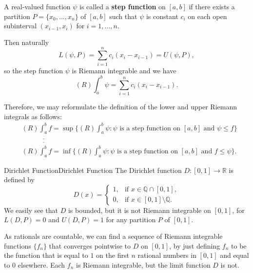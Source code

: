 \documentclass[../main.tex]{subfiles}
\begin{document}
A real-valued function $\psi$ is called a \textbf{step function} on $[a, b]$ if there exists a partition $P = \{ x_0, \ldots , x_n \}$ of $[a, b]$ such that $\psi$ is constant $c_i$ on each open subinterval $(x_{i-1}, x_i)$ for $i = 1, \ldots , n$.

Then naturally
\begin{equation*}
	L(\psi, P) = \sum_{i=1}^{n} c_i (x_i - x_{i-1}) = U(\psi, P),
\end{equation*}
so the step function $\psi$ is Riemann integrable and we have
\begin{equation*}
	(R) \int_a^b \psi = \sum_{i=1}^{n} c_i (x_i - x_{i-1}).
\end{equation*}

Therefore, we may reformulate the definition of the lower and upper Riemann integrals as follows:
\begin{equation}
	\begin{aligned}
		 & (R) \underline{\int_a^b} f = \sup \{ (R) \int_a^b \psi : \psi \text{ is a step function on } [a, b] \text{ and } \psi \leq f \} \\
		 & (R) \overline{\int_a^b} f = \inf \{ (R) \int_a^b \psi : \psi \text{ is a step function on } [a, b] \text{ and } f \leq \psi \}.
	\end{aligned}
\end{equation}

\begin{example}{Dirichlet Function}{Dirichlet Function}
	The Dirichlet function $D: [0, 1] \to \mathbb{R}$ is defined by
	\begin{equation*}
		D(x) = \begin{cases}
			1, & \text{if } x \in \mathbb{Q} \cap [0, 1],      \\
			0, & \text{if } x \in [0, 1] \setminus \mathbb{Q}.
		\end{cases}
	\end{equation*}
	We easily see that $D$ is bounded, but it is not Riemann integrable on $[0, 1]$, for $L(D, P) = 0$ and $U(D, P) = 1$ for any partition $P$ of $[0, 1]$.

	As rationals are countable, we can find a sequence of Riemann integrable functions $\{ f_n \}$ that converges pointwise to $D$ on $[0, 1]$, by just defining $f_n$ to be the function that is equal to $1$ on the first $n$ rational numbers in $[0, 1]$ and equal to $0$ elsewhere. Each $f_n$ is Riemann integrable, but the limit function $D$ is not.
\end{example}
\end{document}
